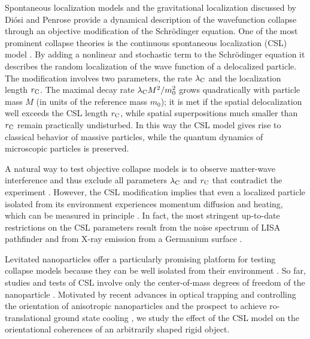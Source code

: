 \documentclass[%
 twocolumn,
 amsmath,amssymb,
 aps,
 pra,
]{revtex4-1}
\begin{document}
Spontaneous localization models \cite{CSLReview,bassi2003dynamical} and the gravitational localization discussed by Di\'osi and Penrose \cite{diosi1984gravitation,Penrose1996} provide a dynamical description of the wavefunction collapse through an objective modification of the Schr\"odinger equation. One of the most prominent collapse theories is the continuous spontaneous localization (CSL) model \cite{Ghirardi1986CSL,Pearle1989CSL,Ghirardi1990CSL}. By adding a nonlinear and stochastic term to the Schr\"odinger equation it describes the random localization of the wave function of a delocalized particle. The modification involves two parameters, the rate $\lambda_{\rm C}$ and the localization length $r_{\rm C}$.  The maximal decay rate $\lambda_{\rm C} M^2/m_0^2$  grows quadratically with particle mass $M$ (in units of the reference mass $m_0$); it is met if the spatial delocalization well exceeds the CSL length $r_{\rm C}$, while spatial superpositions much smaller than $r_{\rm C}$ remain 
practically undisturbed. In this way the CSL model gives rise to classical behavior of massive particles, while the quantum dynamics of microscopic particles is preserved.

A natural way to test objective collapse models is to observe matter-wave interference and thus exclude all parameters $\lambda_{\rm C}$ and $r_{\rm C}$ that contradict the experiment \cite{Nimmrichter2011}. However, the CSL modification implies that even a localized particle isolated from its environment experiences momentum diffusion and heating, which can be measured in principle \cite{Bahrami2014heating,nimmrichter2014optomechanical,Diosi2014heating,Laloe2014BECheating,goldwater2015testing,li2016discriminating}. In fact, the most stringent up-to-date restrictions on the CSL parameters result from the noise spectrum of LISA pathfinder \cite{Carlesso2016LISA} and from X-ray emission from a Germanium surface \cite{curceanu1502x}.

Levitated nanoparticles offer a particularly promising platform for testing collapse models because they can  be well isolated from their environment \cite{optomechanicsReview1,chang2010cavity,romero2010toward,li2011millikelvin,Gieseler2012Nanospheres,romero2012quantum,kiesel2013Nanospheres,asenbaum2013cavity,optomechanicsReview2,Millen2015Nanospheres,Vovrosh2016,Rusconi2016magnetic}. So far, studies and tests of CSL involve only the center-of-mass degrees of freedom of the nanoparticle \cite{goldwater2015testing,li2016discriminating}. Motivated by recent advances in optical trapping and controlling the orientation of anisotropic nanoparticles \cite{Kuhn2015,hoang2016,kuhn2016} and the prospect to achieve ro-translational ground state cooling \cite{stickler2016,Zhong2017}, we study the effect of the CSL model on the orientational coherences of an arbitrarily shaped rigid object. 
\end{document}
